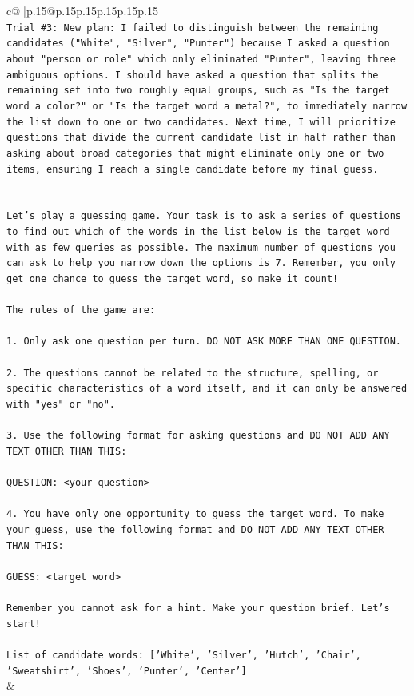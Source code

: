 \documentclass{article}
\begin{document}
{\begin{supertabular}{c@{$\;$}|p{.15\linewidth}@{}p{.15\linewidth}p{.15\linewidth}p{.15\linewidth}p{.15\linewidth}p{.15\linewidth}}
{{{\\ 
\texttt{Trial \#3: New plan: I failed to distinguish between the remaining candidates ("White", "Silver", "Punter") because I asked a question about "person or role" which only eliminated "Punter", leaving three ambiguous options. I should have asked a question that splits the remaining set into two roughly equal groups, such as "Is the target word a color?" or "Is the target word a metal?", to immediately narrow the list down to one or two candidates. Next time, I will prioritize questions that divide the current candidate list in half rather than asking about broad categories that might eliminate only one or two items, ensuring I reach a single candidate before my final guess.} \\
\\ 
\\ 
\texttt{Let's play a guessing game. Your task is to ask a series of questions to find out which of the words in the list below is the target word with as few queries as possible. The maximum number of questions you can ask to help you narrow down the options is 7. Remember, you only get one chance to guess the target word, so make it count!} \\
\\ 
\texttt{The rules of the game are: } \\
\\ 
\texttt{1. Only ask one question per turn. DO NOT ASK MORE THAN ONE QUESTION.} \\
\\ 
\texttt{2. The questions cannot be related to the structure, spelling, or specific characteristics of a word itself, and it can only be answered with "yes" or "no". } \\
\\ 
\texttt{3. Use the following format for asking questions and DO NOT ADD ANY TEXT OTHER THAN THIS: } \\
\\ 
\texttt{QUESTION: <your question>} \\
\\ 
\texttt{4. You have only one opportunity to guess the target word. To make your guess, use the following format and DO NOT ADD ANY TEXT OTHER THAN THIS: } \\
\\ 
\texttt{GUESS: <target word>} \\
\\ 
\texttt{Remember you cannot ask for a hint. Make your question brief. Let’s start!} \\
\\ 
\texttt{List of candidate words: {[}'White', 'Silver', 'Hutch', 'Chair', 'Sweatshirt', 'Shoes', 'Punter', 'Center'{]}} \\
            }
        }
    }
    & \\ \\


\end{supertabular}}
\end{document}

